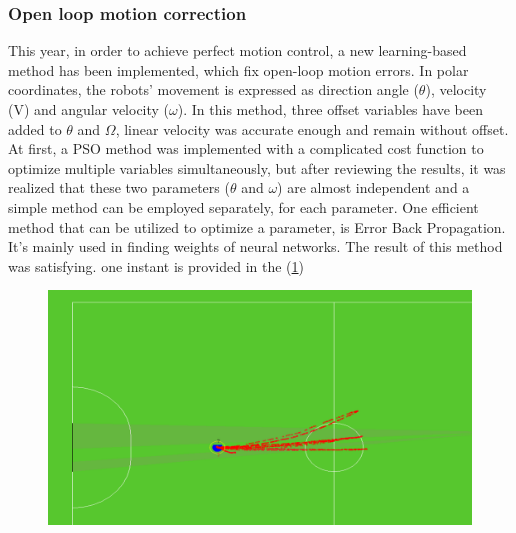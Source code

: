 \documentclass{llncs}
\begin{document}
 \subsubsection{Open loop motion correction}
This year, in order to achieve perfect motion control, a new learning-based method has been implemented, which fix open-loop motion errors.
In polar coordinates, the robots' movement is expressed as direction angle ($\theta$), velocity (V) and angular velocity ($\omega$). In this method, three offset variables have been added to $\theta$ and $\Omega$, linear velocity was accurate enough and remain without offset. 
At first, a PSO method was implemented with a complicated cost function to optimize multiple variables simultaneously, but after reviewing the results, it was realized that these two parameters ($\theta$ and $\omega$) are almost independent and a simple method can be employed separately, for each parameter. 
One efficient method that can be utilized to optimize a parameter, is Error Back Propagation. It's mainly used in finding weights of neural networks.
The result of this method was satisfying. one instant is provided in the (\ref{fig:1})
\begin{figure}
\includegraphics[width=\textwidth]{f1}
\label{fig:1}
\caption{}
\end{figure}
\end{document}
